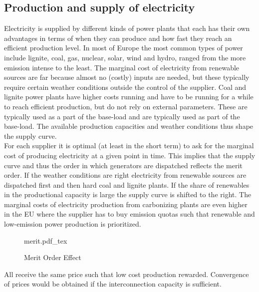 \subsection{Production and supply of electricity}
\label{subsec:t_production}
Electricity is supplied by different kinds of power plants that each has their own advantages in terms of when they can produce and how fast they reach an efficient production level. In most of Europe the most common types of power include lignite, coal, gas, nuclear, solar, wind and hydro, ranged from the more emission intense to the least. The marginal cost of electricity from renewable sources are far because almost no (costly) inputs are needed, but these typically require certain weather conditions outside the control of the supplier. Coal and lignite power plants have higher costs running and have to be running for a while to reach efficient production, but do not rely on external parameters. These are typically used as a part of the base-load  and are typically used as part of the base-load. The available production capacities and weather conditions thus shape the supply curve. \smallskip \\

For each supplier it is optimal (at least in the short term) to ask for the marginal cost of producing electricity at a given point in time. This implies that the supply curve and thus the order in which generators are dispatched reflects the merit order. If the weather conditions are right electricity from renewable sources are dispatched first and then hard coal and lignite plants. If the share of renewables in the productional capacity is large the supply curve is shifted to the right. The marginal costs of electricity production from carbonizing plants are even higher in the EU where the supplier has to buy emission quotas such that renewable and low-emission power production is prioritized. \smallskip \\

\begin{figure}
    \centering
    \caption{Merit Order Effect}
    \label{fig:merit}
    \begin{center}
        \def\svgwidth{0.90\columnwidth}
        {merit.pdf_tex}
    \end{center}
\end{figure}

All receive the same price such that low cost production rewarded. Convergence of prices would be obtained if the interconnection capacity is sufficient.

